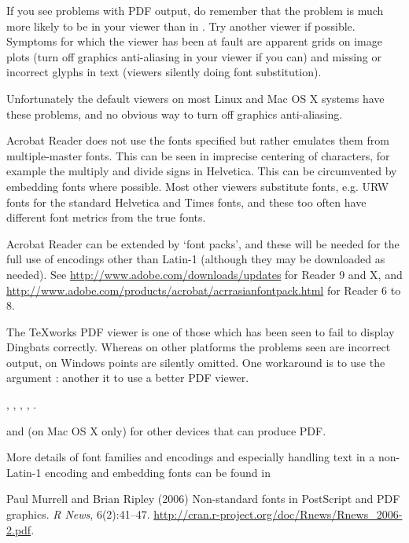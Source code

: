 \begin{Note}\relax
If you see problems with PDF output, do remember that the problem is
much more likely to be in your viewer than in \R{}.  Try another
viewer if possible.  Symptoms for which the viewer has been at fault
are apparent grids on image plots (turn off graphics anti-aliasing
in your viewer if you can) and missing or incorrect glyphs in text
(viewers silently doing font substitution).

Unfortunately the default viewers on most Linux and Mac OS X systems
have these problems, and no obvious way to turn off graphics anti-aliasing.

Acrobat Reader does not use the fonts specified but rather emulates
them from multiple-master fonts.  This can be seen in imprecise
centering of characters, for example the multiply and divide signs in
Helvetica.  This can be circumvented by embedding fonts where
possible.  Most other viewers substitute fonts, e.g. URW fonts for the
standard Helvetica and Times fonts, and these too often have different
font metrics from the true fonts.

Acrobat Reader can be extended by `font packs', and these will
be needed for the full use of encodings other than Latin-1 (although
they may be downloaded as needed).  See
\url{http://www.adobe.com/downloads/updates} for Reader 9 and X, and
\url{http://www.adobe.com/products/acrobat/acrrasianfontpack.html} for
Reader 6 to 8.

The TeXworks PDF viewer is one of those which has been seen to fail to
display Dingbats correctly.  Whereas on other platforms the problems
seen are incorrect output, on Windows points are silently omitted.  One
workaround is to use the argument : another
it to use a better PDF viewer.
\end{Note}
%
\begin{SeeAlso}\relax
{}, ,
,
,
.

 and (on Mac OS X only) 
for other devices that can produce PDF.

More details of font families and encodings and especially handling
text in a non-Latin-1 encoding and embedding fonts can be found in

Paul Murrell and Brian Ripley (2006) Non-standard fonts in PostScript
and PDF graphics. \emph{R News}, 6(2):41--47.
\url{http://cran.r-project.org/doc/Rnews/Rnews_2006-2.pdf}.
\end{SeeAlso}

